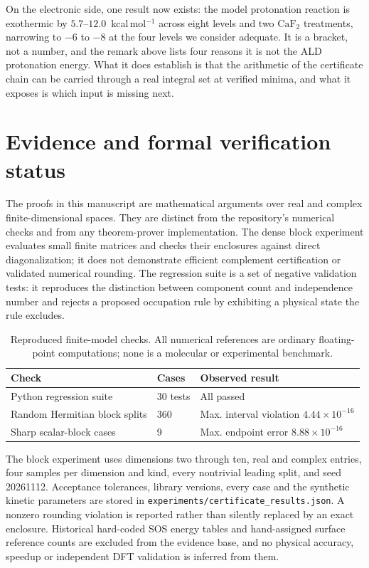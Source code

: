 \documentclass[11pt,a4paper]{article}
\theoremstyle{plain}
\theoremstyle{definition}
\theoremstyle{remark}
\providecommand{\path}[1]{\texttt{#1}}
\begin{document}
On the electronic side, one result now exists: the model protonation reaction is
exothermic by $5.7$--$12.0$~kcal\,mol$^{-1}$ across eight levels and two
$\mathrm{CaF_2}$ treatments, narrowing to $-6$ to $-8$ at the four levels we
consider adequate. It is a bracket, not a number, and the remark above lists four
reasons it is not the ALD protonation energy. What it does establish is that the
arithmetic of the certificate chain can be carried through a real integral set at
verified minima, and what it exposes is which input is missing next.


\section{Evidence and formal verification status}
\label{sec:formalization}
The proofs in this manuscript are mathematical arguments over real and complex
finite-dimensional spaces. They are distinct from the repository's numerical
checks and from any theorem-prover implementation. The dense block experiment
evaluates small finite matrices and checks their enclosures against direct
diagonalization; it does not demonstrate efficient complement certification or
validated numerical rounding. The regression suite is a set of negative
validation tests: it reproduces the distinction between component count and
independence number and rejects a proposed occupation rule by exhibiting a
physical state the rule excludes.

\begin{table}[ht]
\centering
\caption{Reproduced finite-model checks. All numerical references are ordinary
floating-point computations; none is a molecular or experimental benchmark.}
\begin{tabular}{lll}
\hline
Check & Cases & Observed result \\
\hline
Python regression suite & 30 tests & All passed \\
Random Hermitian block splits & 360 & Max. interval violation $4.44\times10^{-16}$ \\
Sharp scalar-block cases & 9 & Max. endpoint error $8.88\times10^{-16}$ \\
\hline
\end{tabular}
\label{tab:reproduced}
\end{table}

The block experiment uses dimensions two through ten, real and complex entries,
four samples per dimension and kind, every nontrivial leading split, and seed
20261112. Acceptance tolerances, library versions, every case and the synthetic
kinetic parameters are stored in \path{experiments/certificate_results.json}. A
nonzero rounding violation is reported rather than silently replaced by an exact
enclosure. Historical hard-coded SOS energy tables and hand-assigned surface
reference counts are excluded from the evidence base, and no physical accuracy,
speedup or independent DFT validation is inferred from them.
\end{document}
